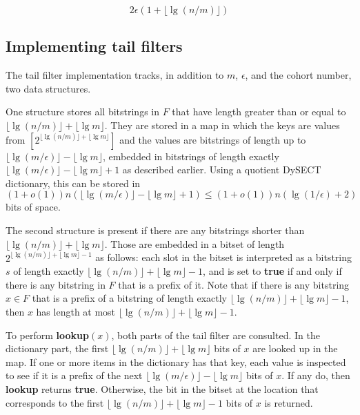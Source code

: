 \documentclass[11pt,letterpaper]{article}
\begin{document}
\begin{equation}
  2 \epsilon (1 + \lfloor \lg (n/m) \rfloor)
\end{equation}

\subsection{Implementing tail filters}

The tail filter implementation tracks, in addition to $m$, $\epsilon$, and the cohort number, two data structures.

One structure stores all bitstrings in $F$ that have length greater than or equal to $\lfloor \lg (n/m) \rfloor + \lfloor \lg m \rfloor$.
They are stored in a map in which the keys are values from $[2^{\lfloor \lg (n/m) \rfloor + \lfloor \lg m \rfloor}]$ and the values are bitstrings of length up to $\lfloor \lg (m/\epsilon) \rfloor - \lfloor \lg m \rfloor$, embedded in bitstrings of length exactly $\lfloor \lg (m/\epsilon) \rfloor - \lfloor \lg m \rfloor + 1$ as described earlier.
Using a quotient DySECT dictionary, this can be stored in $(1 + o(1))n(\lfloor \lg (m/\epsilon) \rfloor - \lfloor \lg m \rfloor + 1) \leq (1+o(1))n(\lg (1/\epsilon) + 2)$ bits of space.

The second structure is present if there are any bitstrings shorter than $\lfloor \lg (n/m) \rfloor + \lfloor \lg m \rfloor$.
Those are embedded in a bitset of length $2^{\lfloor \lg (n/m) \rfloor + \lfloor \lg m \rfloor - 1}$ as follows:
each slot in the bitset is interpreted as a bitstring $s$ of length exactly $\lfloor \lg (n/m) \rfloor + \lfloor \lg m \rfloor - 1$, and is set to {\bf true} if and only if there is any bitstring in $F$ that is a prefix of it.
Note that if there is any bitstring $x \in F$ that is a prefix of a bitstring of length exactly $\lfloor \lg (n/m) \rfloor + \lfloor \lg m \rfloor - 1$, then $x$ has length at most $\lfloor \lg (n/m) \rfloor + \lfloor \lg m \rfloor - 1$.

To perform {\bf lookup$(x)$}, both parts of the tail filter are consulted.
In the dictionary part, the first $\lfloor \lg (n/m) \rfloor + \lfloor \lg m \rfloor$ bits of $x$ are looked up in the map.
If one or more items in the dictionary has that key, each value is inspected to see if it is a prefix of the next $\lfloor \lg(m/\epsilon) \rfloor - \lfloor \lg m \rfloor$ bits of $x$.
If any do, then {\bf lookup} returns {\bf true}.
Otherwise, the bit in the bitset at the location that corresponds to the first $\lfloor \lg (n/m) \rfloor + \lfloor \lg m \rfloor - 1$ bits of $x$ is returned.
\end{document}
